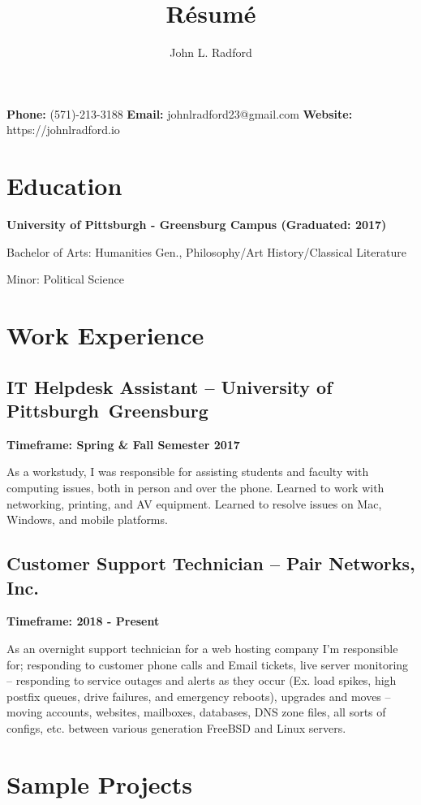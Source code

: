 \documentclass{article}
\makeatletter
\renewcommand{\maketitle}{
\begin{flushleft}
{\huge\bfseries
\theauthor}

\vspace{.25em}
\textbf{Phone:} (571)-213-3188
\textbf{Email:} johnlradford23@gmail.com
\textbf{Website:} https://johnlradford.io 
\end{flushleft}
}
\makeatother
\begin{document}
\title{R\'esum\'e}
\author{John L. Radford}

\maketitle

\section{Education}

\noindent
\textbf{University of Pittsburgh - Greensburg Campus (Graduated: 2017)}

Bachelor of Arts: Humanities Gen., Philosophy/Art History/Classical Literature

Minor: Political Science

\section{Work Experience}

\subsection{IT Helpdesk Assistant -- University of Pittsburgh Greensburg}

\noindent
\textbf{Timeframe: Spring \& Fall Semester 2017}

As a workstudy, I was responsible for assisting students and faculty with
computing issues, both in person and over the phone. Learned to work with
networking, printing, and AV equipment. Learned to resolve issues on Mac,
Windows, and mobile platforms.

\subsection{Customer Support Technician -- Pair Networks, Inc.}

\noindent
\textbf{Timeframe: 2018 - Present}

As an overnight support technician for a web hosting company I'm responsible
for; responding to customer phone calls and Email tickets, live server
monitoring -- responding to service outages and alerts as they occur (Ex. load
spikes, high postfix queues, drive failures, and emergency reboots), upgrades
and moves -- moving accounts, websites, mailboxes, databases, DNS zone files,
all sorts of configs, etc. between various generation FreeBSD and Linux servers.

\section{Sample Projects}
\end{document}
